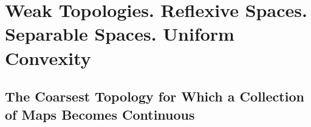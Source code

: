 \section{Weak Topologies. Reflexive Spaces. Separable Spaces. Uniform Convexity}

\subsection{The Coarsest Topology for Which a Collection of Maps Becomes Continuous}


